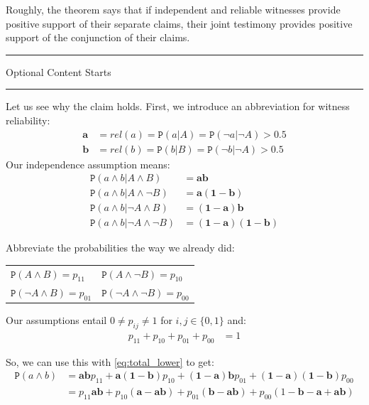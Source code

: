 \documentclass{ifcolog}
\newcommand{\intermezzoa}{
	\begin{minipage}[c]{13cm}
	\begin{center}\rule{10cm}{0.4pt}



	\tiny{\sc Optional Content Starts}
	
	\vspace{-1mm}
	
	\rule{10cm}{0.4pt}\end{center}
	\end{minipage}\nopagebreak 
	}
\newcommand{\pr}[1]{\mbox{$\mathtt{P}(#1)$}}
\newcommand{\n}{\neg}
\newcommand{\et}{\wedge}
\begin{document}
Roughly, the theorem says that if independent and reliable witnesses provide positive  support of their separate claims, their joint testimony provides positive support of the conjunction of their claims. 


\intermezzoa

Let us see why the claim holds. First, we introduce an abbreviation for witness reliability: 
  \begin{align*}\mathbf{a} &=rel(a)=\pr{a\vert A}=\pr{\n a\vert \n A}>0.5\\ 
\mathbf{b} &=rel(b)=\pr{b\vert B}=\pr{\n b\vert \n A}>0.5
\end{align*}
Our independence assumption means:
\begin{align*}
\pr{a\et b \vert A\et B}  &= \mathbf{ab}\\
\pr{a\et b \vert A\et \n B} & = \mathbf{a(1-b)}\\
\pr{a\et b \vert \n A\et B}  & = \mathbf{(1-a)b}\\
\pr{a\et b \vert \n A\et \n  B}  & = \mathbf{(1-a)(1-b)}
\end{align*}

\vspace{-2mm}

Abbreviate the probabilities the way we already did:

\begin{center}
\begin{tabular}{ll}
$\pr{A\et B} = p_{11}$ & $\pr{A\et \n B} = p_{10}$\\
$\pr{\n A \et B} = p_{01}$ & $\pr{\n A \et \n B}=p_{00}$
\end{tabular}
\end{center}
Our assumptions entail $0\neq p_{ij}\neq 1$ for $i,j\in \{0,1\}$ and:
\begin{align}\label{eq:sumupto1}
p_{11}+p_{10}+p_{01}+p_{00}&=1
\end{align}

\noindent So, we can use this with \eqref{eq:total_lower} to get:
\begin{align}\label{eq:aetb}
\pr{a\et b} & =  \mathbf{ab}p_{11} + \mathbf{a(1-b)}p_{10}+\mathbf{(1-a)b}p_{01} + \mathbf{(1-a)(1-b)}p_{00}\\ \nonumber
& = p_{11}\mathbf{ab} + p_{10}(\mathbf{a}-\mathbf{ab}) + p_{01}(\mathbf{b}-\mathbf{ab})+p_{00}(1-\mathbf{b}-\mathbf{a}+\mathbf{ab})
\end{align}
\end{document}
